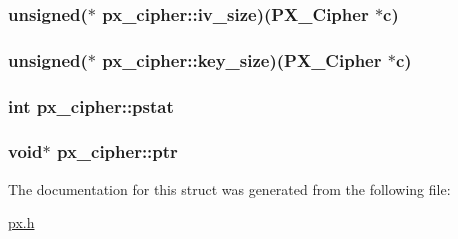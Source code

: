 \hypertarget{structpx__cipher_a17865fc83c08e2ec6489bf2ed50230ca}{
\subsubsection[{iv\-\_\-size}]{\setlength{\rightskip}{0pt plus 5cm}unsigned($\ast$ px\-\_\-cipher\-::iv\-\_\-size)({\bf P\-X\-\_\-\-Cipher} $\ast$c)}}\label{structpx__cipher_a17865fc83c08e2ec6489bf2ed50230ca}
\hypertarget{structpx__cipher_abb0e876a446ea3b60312600756c84ba4}{
\subsubsection[{key\-\_\-size}]{\setlength{\rightskip}{0pt plus 5cm}unsigned($\ast$ px\-\_\-cipher\-::key\-\_\-size)({\bf P\-X\-\_\-\-Cipher} $\ast$c)}}\label{structpx__cipher_abb0e876a446ea3b60312600756c84ba4}
\hypertarget{structpx__cipher_a38cb7dae8989ea328c191c73d91f6c31}{
\subsubsection[{pstat}]{\setlength{\rightskip}{0pt plus 5cm}int px\-\_\-cipher\-::pstat}}\label{structpx__cipher_a38cb7dae8989ea328c191c73d91f6c31}
\hypertarget{structpx__cipher_a73945c5645b030ef56f93619fd054fb4}{
\subsubsection[{ptr}]{\setlength{\rightskip}{0pt plus 5cm}void$\ast$ px\-\_\-cipher\-::ptr}}\label{structpx__cipher_a73945c5645b030ef56f93619fd054fb4}


The documentation for this struct was generated from the following file\-:\begin{DoxyCompactItemize}
\item 
\hyperlink{px_8h}{px.\-h}\end{DoxyCompactItemize}
